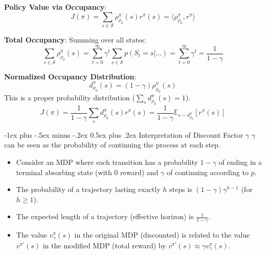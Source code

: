 \documentclass[10pt,landscape]{article}
\makeatletter
\renewcommand{\section}{\@startsection{section}{1}{0mm}%
                                {-1ex plus -.5ex minus -.2ex}%
                                {0.5ex plus .2ex}%
                                {\normalfont\large\bfseries}}
\makeatother
\begin{document}
\begin{multicols}{3}
    \textbf{Policy Value via Occupancy}:
    $$ J(\pi) = \sum_{s \in \mathcal{S}} \rho^\pi_{\rho_0}(s) r^\pi(s) = \langle \rho^\pi_{\rho_0}, r^\pi \rangle $$

    \textbf{Total Occupancy}: Summing over all states:
    $$ \sum_{s \in \mathcal{S}} \rho^\pi_{\rho_0}(s) = \sum_{t=0}^\infty \gamma^t \sum_{s \in \mathcal{S}} p(S_t=s | \dots) = \sum_{t=0}^\infty \gamma^t = \frac{1}{1-\gamma} $$

    \textbf{Normalized Occupancy Distribution}:
    $$ d^\pi_{\rho_0}(s) = (1-\gamma) \rho^\pi_{\rho_0}(s) $$
    This is a proper probability distribution ($\sum_s d^\pi_{\rho_0}(s) = 1$).
    $$ J(\pi) = \frac{1}{1-\gamma} \sum_s d^\pi_{\rho_0}(s) r^\pi(s) = \frac{1}{1-\gamma} \mathbb{E}_{s \sim d^\pi_{\rho_0}} [r^\pi(s)] $$

    \section{Interpretation of Discount Factor $\gamma$}
    $\gamma$ can be seen as the probability of continuing the process at each step.
    \begin{itemize}[label={--},leftmargin=4mm, itemsep=-.4mm]
        \item Consider an MDP where each transition has a probability $1-\gamma$ of ending in a terminal absorbing state (with 0 reward) and $\gamma$ of continuing according to $p$.
        \item The probability of a trajectory lasting exactly $h$ steps is $(1-\gamma)\gamma^{h-1}$ (for $h \ge 1$).
        \item The expected length of a trajectory (effective horizon) is $\frac{1}{1-\gamma}$.
        \item The value $v^\pi_\gamma(s)$ in the original MDP (discounted) is related to the value $v^{\pi'}(s)$ in the modified MDP (total reward) by $v^{\pi'}(s) \approx \gamma v^\pi_\gamma(s)$.
    \end{itemize}


\end{multicols}
\end{document}
